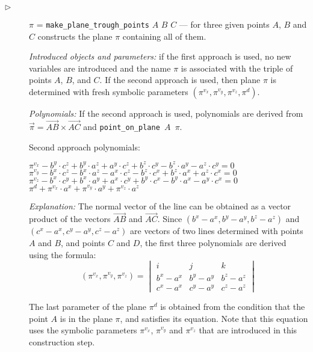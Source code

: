 \documentclass{article}
\begin{document}
\begin{description}
\item[$\triangleright$] $\pi$ = {\tt make\_plane\_trough\_points} $A$
  $B$ $C$ --- for three given points $A$, $B$ and $C$ constructs the
  plane $\pi$ containing all of them.

  {\em Introduced objects and parameters:} if the first approach is
  used, no new variables are introduced and the name $\pi$ is
  associated with the triple of points $A$, $B$, and $C$. If the
  second approach is used, then plane $\pi$ is determined with fresh
  symbolic parameters $(\pi^{v_x}, \pi^{v_y}, \pi^{v_z}, \pi^{d})$.

  {\em Polynomials:} If the second approach is used, polynomials are
  derived from
  $\overrightarrow{\pi} = \overrightarrow{AB} \times
  \overrightarrow{AC}$ and {\tt point\_on\_plane $A$ $\pi$}.

Second approach polynomials:
\begin{tabbing}
$\pi^{v_x} - b^y\cdot c^z + b^y\cdot a^z + a^y\cdot c^z + b^z\cdot c^y - b^z\cdot a^y - a^z\cdot c^y = 0$ \\
$\pi^{v_y} - b^x\cdot c^z - b^x\cdot a^z - a^x\cdot c^z - b^z\cdot c^x + b^z\cdot a^x + a^z\cdot c^x = 0$ \\
$\pi^{v_z} - b^x\cdot c^y + b^x\cdot a^y + a^x\cdot c^y + b^y\cdot c^x - b^y\cdot a^x - a^y\cdot c^x = 0$ \\
$\pi^{d} + \pi^{v_x}\cdot a^x + \pi^{v_y}\cdot a^y + \pi^{v_z}\cdot a^z$
\end{tabbing}

{\em Explanation:} The normal vector of the line can be obtained as a
vector product of the vectors $\overrightarrow{AB}$ and
$\overrightarrow{AC}$. Since $(b^x - a^x, b^y - a^y, b^z - a^z)$ and
$(c^x - a^x, c^y - a^y, c^z - a^z)$ are vectors of two lines
determined with points $A$ and $B$, and points $C$ and $D$, the first
three polynomials are derived using the formula:
$$(\pi^{v_x}, \pi^{v_y}, \pi^{v_z}) = \begin{vmatrix} i & j & k \\ b^x
  - a^x & b^y - a^y & b^z - a^z \\ c^x - a^x & c^y - a^y & c^z - a^z
\end{vmatrix}$$

The last parameter of the plane $\pi^{d}$ is obtained from the
condition that the point $A$ is in the plane $\pi$, and satisfies its
equation. Note that this equation uses the symbolic parameters
$\pi^{v_x}$, $\pi^{v_y}$ and $\pi^{v_z}$ that are introduced in this
construction step.



\end{description}
\end{document}
